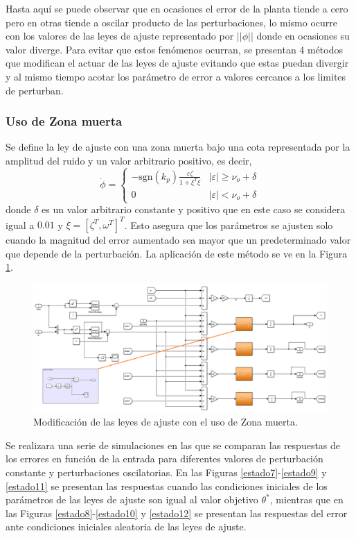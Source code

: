 \documentclass[letterpaper,11pt]{article} %
\begin{document}
Hasta aquí se puede observar que en ocasiones el error de la planta tiende a cero pero en otras tiende a oscilar producto de las perturbaciones, lo mismo ocurre con los valores de las leyes de ajuste representado por $||\phi||$ donde en ocasiones su valor diverge. Para evitar que estos fenómenos ocurran, se presentan 4 métodos que modifican el actuar de las leyes de ajuste evitando que estas puedan divergir y al mismo tiempo acotar los parámetro de error a valores cercanos a los limites de perturban.

\newpage
\subsubsection{Uso de Zona muerta}
Se define la ley de ajuste con una zona muerta bajo una cota representada por la amplitud del ruido y un valor arbitrario positivo, es decir,
\begin{equation}
	\dot{\phi} = \left\{ \begin{array}{cc}
	 -\mathrm{sgn}(k_p)\frac{\varepsilon \zeta}{1 + \xi^T \xi} & |\varepsilon| \ge \nu_o + \delta \\
	 0 & |\varepsilon| < \nu_o + \delta
	 \end{array}\right.
\end{equation}
donde $\delta$ es un valor arbitrario constante y positivo que en este caso se considera igual a $0.01$ y $\xi = [\zeta^T, \omega^T]^T$. Esto asegura que los parámetros se ajusten solo cuando la magnitud del error aumentado sea mayor que un predeterminado valor que depende de la perturbación. La aplicación de este método se ve en la Figura \ref{deadzone}.
\begin{figure}
	\centering
	\includegraphics[width=15cm]{deadzone.png}
	\caption{Modificación de las leyes de ajuste con el uso de Zona muerta.}
	\label{deadzone}
\end{figure}
Se realizara una serie de simulaciones en las que se comparan las respuestas de los errores en función de la entrada para diferentes valores de perturbación constante y perturbaciones oscilatorias. En las Figuras \ref{estado7}-\ref{estado9} y \ref{estado11} se presentan las respuestas cuando las condiciones iniciales de los parámetros de las leyes de ajuste son igual al valor objetivo $\theta^*$, mientras que en las Figuras \ref{estado8}-\ref{estado10} y \ref{estado12} se presentan las respuestas del error ante condiciones iniciales aleatoria de las leyes de ajuste.
\end{document}
